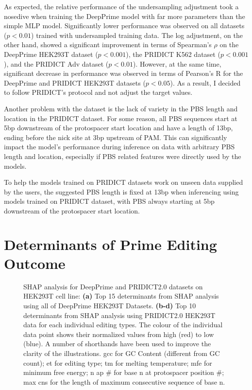 As expected, the relative performance of the undersampling adjustment took a nosedive when training the DeepPrime model with far more parameters than the simple MLP model. Significantly lower performance was observed on all datasets ($p<0.01$) trained with undersampled training data. The log adjustment, on the other hand, showed a significant improvement in terms of Spearman's $\rho$ on the DeepPrime HEK293T dataset ($p<0.001$), the PRIDICT K562 dataset ($p<0.001$), and the PRIDICT Adv dataset ($p<0.01$). However, at the same time, significant decrease in performance was observed in terms of Pearson's R for the DeepPrime and PRIDICT HEK293T datasets ($p<0.05$). As a result, I decided to follow PRIDICT's protocol and not adjust the target values. 

Another problem with the dataset is the lack of variety in the PBS length and location in the PRIDICT dataset. For some reason, all PBS sequences start at 5bp downstream of the protospacer start location and have a length of 13bp, ending before the nick site at 3bp upstream of PAM. This can significantly impact the model's performance during inference on data with arbitrary PBS length and location, especially if PBS related features were directly used by the models. 

To help the models trained on PRIDICT datasets work on unseen data supplied by the users, the suggested PBS length is fixed at 13bp when inferencing using models trained on PRIDICT dataset, with PBS always starting at 5bp downstream of the protospacer start location.



\section{Determinants of Prime Editing Outcome}
\label{sec:determinants}

\begin{figure}
    \caption[SHAP analysis for DeepPrime and PRIDICT2.0 datasets]{SHAP analysis for DeepPrime and PRIDICT2.0 datasets on HEK293T cell line: \textbf{(a)} Top 15 determinants from SHAP analysis using all of DeepPrime HEK293T Datasets. \textbf{(b-d)} Top 10 determinants from SHAP analysis using PRIDICT2.0 HEK293T data for each individual editing types. The colour of the individual data point shows their normalized values from high (red) to low (blue). A number of shorthands have been used to improve the clarity of the illustrations. gcc for GC Content (different from GC count); et for editing type; tm for melting temperature; mfe for minimum free energy; n ap \# for base n at protospacer position \#; max cns for the length of maximum consecutive sequence of base n.} 
    \label{fig:shap}
\end{figure}

